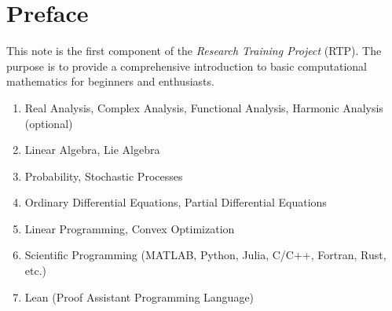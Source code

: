 \chapter*{Preface}

This note is the first component of the \emph{Research Training Project} (RTP).  The purpose is to provide a comprehensive introduction to basic computational mathematics for beginners and enthusiasts. 

\vspace{2cm}

{}

\begin{enumerate}
    \item Real Analysis, Complex Analysis, Functional Analysis, Harmonic Analysis (optional)
    \item Linear Algebra, Lie Algebra 
    \item Probability, Stochastic Processes
    \item Ordinary Differential Equations, Partial Differential Equations 
    \item Linear Programming, Convex Optimization
    \item Scientific Programming (MATLAB, Python, Julia, C/C++, Fortran, Rust, etc.)
    \item Lean (Proof Assistant Programming Language)
\end{enumerate}